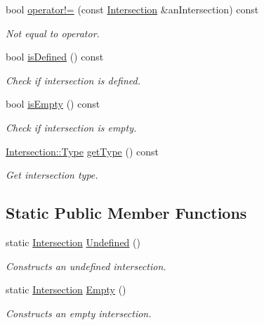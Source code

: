 \begin{DoxyCompactItemize}
$$bool \hyperlink{classlibrary_1_1math_1_1geom_1_1d3_1_1_intersection_a8e3e47ed63f5c539cc39625b512c4b9e}{operator!=} (const \hyperlink{classlibrary_1_1math_1_1geom_1_1d3_1_1_intersection}{Intersection} \&an\+Intersection) const
\begin{DoxyCompactList}\small\item\em Not equal to operator. \end{DoxyCompactList}\item 
bool \hyperlink{classlibrary_1_1math_1_1geom_1_1d3_1_1_intersection_a746fc547529ce91a99412597eb5ae559}{is\+Defined} () const
\begin{DoxyCompactList}\small\item\em Check if intersection is defined. \end{DoxyCompactList}\item 
bool \hyperlink{classlibrary_1_1math_1_1geom_1_1d3_1_1_intersection_aad021013a517375d56e2110792ad7b07}{is\+Empty} () const
\begin{DoxyCompactList}\small\item\em Check if intersection is empty. \end{DoxyCompactList}\item 
\hyperlink{classlibrary_1_1math_1_1geom_1_1d3_1_1_intersection_a3465d607fd42380f350598e055271b05}{Intersection\+::\+Type} \hyperlink{classlibrary_1_1math_1_1geom_1_1d3_1_1_intersection_aead6925dc35a2f6aec30373ca1556600}{get\+Type} () const
\begin{DoxyCompactList}\small\item\em Get intersection type. \end{DoxyCompactList}\end{DoxyCompactItemize}
\subsection*{Static Public Member Functions}
\begin{DoxyCompactItemize}
\item 
static \hyperlink{classlibrary_1_1math_1_1geom_1_1d3_1_1_intersection}{Intersection} \hyperlink{classlibrary_1_1math_1_1geom_1_1d3_1_1_intersection_a6ce0af0ff5c24a4b56c264d2d3d6e59b}{Undefined} ()
\begin{DoxyCompactList}\small\item\em Constructs an undefined intersection. \end{DoxyCompactList}\item 
static \hyperlink{classlibrary_1_1math_1_1geom_1_1d3_1_1_intersection}{Intersection} \hyperlink{classlibrary_1_1math_1_1geom_1_1d3_1_1_intersection_af0f1aed5c97a5142a4b20cb8edcb78e0}{Empty} ()
\begin{DoxyCompactList}\small\item\em Constructs an empty intersection. \end{DoxyCompactList}\end{DoxyCompactItemize}


